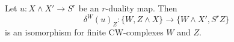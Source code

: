 Let $u: X \wedge X' \rightarrow S^r$ be an $r$-duality map. Then
$$\delta^W(u)_Z: \{W, Z \wedge X\} \rightarrow \{W \wedge X', S^r Z\}$$
is an isomorphism for finite CW-complexes $W$ and $Z$.
